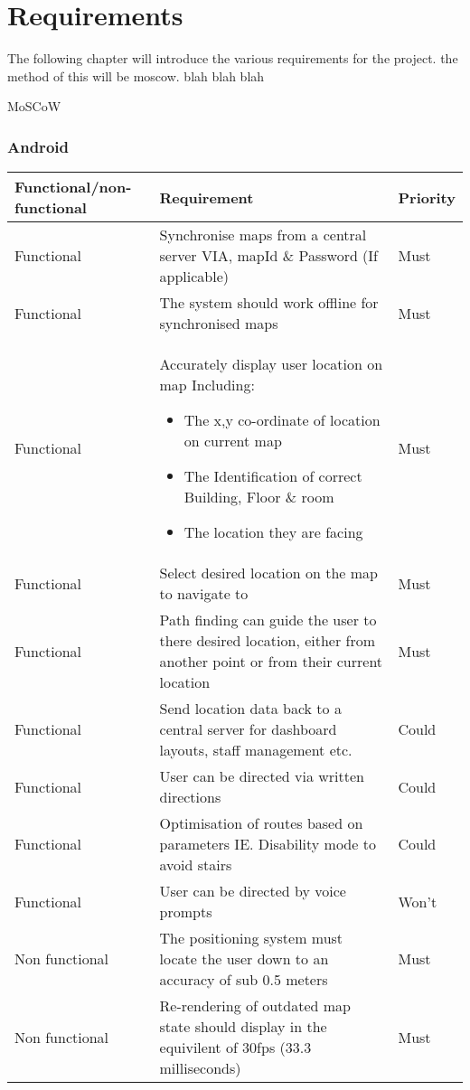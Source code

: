 \section{Requirements}
The following chapter will introduce the various requirements for the project. the method of this will be moscow. blah blah blah

MoSCoW
\subsubsection{Android}
{\renewcommand{\arraystretch}{1.5}%
\begin{tabular}{| p{} | p{} | p{}|}
	\hline
	Functional/non-functional & Requirement & Priority\\\hline
	Functional & Synchronise maps from a central server VIA, mapId \& Password (If applicable)& Must\\\hline
	Functional & The system should work offline for synchronised maps & Must\\\hline
	Functional & 
		Accurately display user location on map Including:
			\begin{itemize}
				\item The x,y co-ordinate of location on current map
				\item The Identification of correct Building, Floor \& room
				\item The location they are facing
			\end{itemize}
	 & Must\\\hline
	Functional & Select desired location on the map to navigate to & Must\\\hline
	Functional & Path finding can guide the user to there desired location, either from another point or from their current location & Must\\\hline
	Functional & Send location data back to a central server for dashboard layouts, staff management etc. & Could\\\hline
	Functional & User can be directed via written directions & Could\\\hline
	Functional & Optimisation of routes based on parameters IE. Disability mode to avoid stairs & Could\\\hline
	Functional & User can be directed by voice prompts & Won't\\\hline
	Non functional & The positioning system must locate the user down to an accuracy of sub 0.5 meters & Must\\\hline
	Non functional & Re-rendering of outdated map state should display in the equivilent of 30fps (33.3 milliseconds) & Must\\\hline


\end{tabular}}
